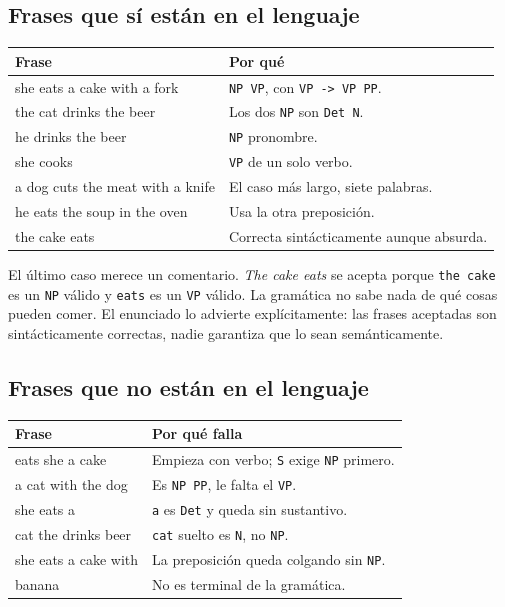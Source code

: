 \documentclass[11pt,a4paper]{article}
\newcommand{\gram}[1]{\texttt{#1}}
\begin{document}
\subsection{Frases que sí están en el lenguaje}

\begin{center}
\begin{tabular}{@{}>{\ttfamily}l p{7.5cm}@{}}
\toprule
\textrm{\textbf{Frase}} & \textbf{Por qué} \\
\midrule
she eats a cake with a fork & \gram{NP VP}, con \gram{VP -> VP PP}. \\
the cat drinks the beer     & Los dos \gram{NP} son \gram{Det N}. \\
he drinks the beer          & \gram{NP} pronombre. \\
she cooks                   & \gram{VP} de un solo verbo. \\
a dog cuts the meat with a knife & El caso más largo, siete palabras. \\
he eats the soup in the oven & Usa la otra preposición. \\
the cake eats               & Correcta sintácticamente aunque absurda. \\
\bottomrule
\end{tabular}
\end{center}

El último caso merece un comentario. \textit{The cake eats} se acepta porque
\gram{the cake} es un \gram{NP} válido y \gram{eats} es un \gram{VP} válido.
La gramática no sabe nada de qué cosas pueden comer. El enunciado lo advierte
explícitamente: las frases aceptadas son sintácticamente correctas, nadie
garantiza que lo sean semánticamente.

\subsection{Frases que no están en el lenguaje}

\begin{center}
\begin{tabular}{@{}>{\ttfamily}l p{7.5cm}@{}}
\toprule
\textrm{\textbf{Frase}} & \textbf{Por qué falla} \\
\midrule
eats she a cake     & Empieza con verbo; \gram{S} exige \gram{NP} primero. \\
a cat with the dog  & Es \gram{NP PP}, le falta el \gram{VP}. \\
she eats a          & \gram{a} es \gram{Det} y queda sin sustantivo. \\
cat the drinks beer & \gram{cat} suelto es \gram{N}, no \gram{NP}. \\
she eats a cake with & La preposición queda colgando sin \gram{NP}. \\
banana              & No es terminal de la gramática. \\
\bottomrule
\end{tabular}
\end{center}
\end{document}
